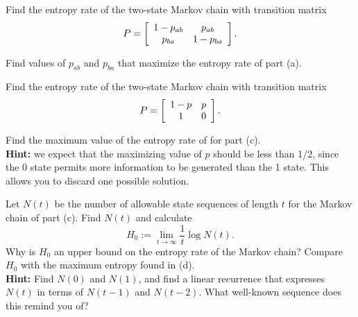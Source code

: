 \documentclass[a4paper,10pt,landscape,twocolumn]{scrartcl}
\begin{document}
\begin{exercise}
	\begin{subex}[(2pt)]
	Find the entropy rate of the two-state Markov chain with transition matrix
	\[
	P = \left[
	\begin{array}{c c}
	1-p_{ab} & p_{ab}\\
	p_{ba} & 1 - p_{ba}
	\end{array}
	\right].
	\]
	\end{subex}
	\begin{subex}[(1pt)]
	Find values of $p_{ab}$ and $p_{ba}$ that maximize the entropy rate of part (a).
	\end{subex}
	\begin{subex}[(1pt)]
	Find the entropy rate of the two-state Markov chain with transition matrix
	\[
	P = \left[
	\begin{array}{c c}
	1-p & p\\
	1 & 0
	\end{array}
	\right].
	\]
	\end{subex}
	\begin{subex}[(2pt)]
	Find the maximum value of the entropy rate of for part (c). \\\textbf{Hint:} we expect that the maximizing value of $p$ should be less than 1/2, since the 0 state permits more information to be generated than the 1 state. This allows you to discard one possible solution.
	\end{subex}
	\begin{subex}[(4pt)]
	Let $N(t)$ be the number of allowable state sequences of length $t$ for the Markov chain of part (c). Find $N(t)$ and calculate
	\[
	H_0 := \lim_{t \to \infty} \frac{1}{t} \log N(t).
	\]
	Why is $H_0$ an upper bound on the entropy rate of the Markov chain? Compare $H_0$ with the maximum entropy found in (d).
	\\\textbf{Hint:} Find $N(0)$ and $N(1)$, and find a linear recurrence that expresses $N(t)$ in terms of $N(t-1)$ and $N(t-2)$. What well-known sequence does this remind you of?
	\end{subex}
\end{exercise}
\end{document}
